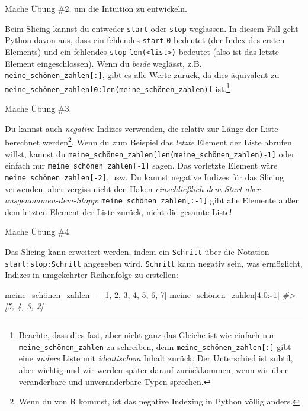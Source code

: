 \documentclass[
]{book}
\newenvironment{Shaded}{\begin{snugshade}}{\end{snugshade}}
\newcommand{\CommentTok}[1]{\textcolor[rgb]{0.56,0.35,0.01}{\textit{#1}}}
\newcommand{\DecValTok}[1]{\textcolor[rgb]{0.00,0.00,0.81}{#1}}
\newcommand{\NormalTok}[1]{#1}
\newcommand{\OperatorTok}[1]{\textcolor[rgb]{0.81,0.36,0.00}{\textbf{#1}}}
\begin{document}
Mache Übung \#2, um die Intuition zu entwickeln.

Beim Slicing kannst du entweder \texttt{start} oder \texttt{stop} weglassen. In diesem Fall geht Python davon aus, dass ein fehlendes \texttt{start} \texttt{0} bedeutet (der Index des ersten Elements) und ein fehlendes \texttt{stop} \texttt{len(\textless{}list\textgreater{})} bedeutet (also ist das letzte Element eingeschlossen). Wenn du \emph{beide} weglässt, z.B. \texttt{meine\_schönen\_zahlen{[}:{]}}, gibt es alle Werte zurück, da dies äquivalent zu \texttt{meine\_schönen\_zahlen{[}0:len(meine\_schönen\_zahlen){]}} ist.\footnote{Beachte, dass dies fast, aber nicht ganz das Gleiche ist wie einfach nur \texttt{meine\_schönen\_zahlen} zu schreiben, denn \texttt{meine\_schönen\_zahlen{[}:{]}} gibt eine \emph{andere} Liste mit \emph{identischem} Inhalt zurück. Der Unterschied ist subtil, aber wichtig und wir werden später darauf zurückkommen, wenn wir über veränderbare und unveränderbare Typen sprechen.}

Mache Übung \#3.

Du kannst auch \emph{negative} Indizes verwenden, die relativ zur Länge der Liste berechnet werden\footnote{Wenn du von R kommst, ist das negative Indexing in Python völlig anders.}. Wenn du zum Beispiel das \emph{letzte} Element der Liste abrufen willst, kannst du \texttt{meine\_schönen\_zahlen{[}len(meine\_schönen\_zahlen)-1{]}} oder einfach nur \texttt{meine\_schönen\_zahlen{[}-1{]}} sagen. Das vorletzte Element wäre \texttt{meine\_schönen\_zahlen{[}-2{]}}, usw. Du kannst negative Indizes für das Slicing verwenden, aber vergiss nicht den Haken \emph{einschließlich-dem-Start-aber-ausgenommen-dem-Stopp}: \texttt{meine\_schönen\_zahlen{[}:-1{]}} gibt alle Elemente außer dem letzten Element der Liste zurück, nicht die gesamte Liste!

Mache Übung \#4.

Das Slicing kann erweitert werden, indem ein \texttt{Schritt} über die Notation \texttt{start:stop:Schritt} angegeben wird. \texttt{Schritt} kann negativ sein, was ermöglicht, Indizes in umgekehrter Reihenfolge zu erstellen:

\begin{Shaded}
\begin{Highlighting}[]
\NormalTok{meine\_schönen\_zahlen }\OperatorTok{=}\NormalTok{ [}\DecValTok{1}\NormalTok{, }\DecValTok{2}\NormalTok{, }\DecValTok{3}\NormalTok{, }\DecValTok{4}\NormalTok{, }\DecValTok{5}\NormalTok{, }\DecValTok{6}\NormalTok{, }\DecValTok{7}\NormalTok{]}
\NormalTok{meine\_schönen\_zahlen[}\DecValTok{4}\NormalTok{:}\DecValTok{0}\NormalTok{:}\OperatorTok{{-}}\DecValTok{1}\NormalTok{]}
\CommentTok{\#\textgreater{} [5, 4, 3, 2]}
\end{Highlighting}
\end{Shaded}
\end{document}
